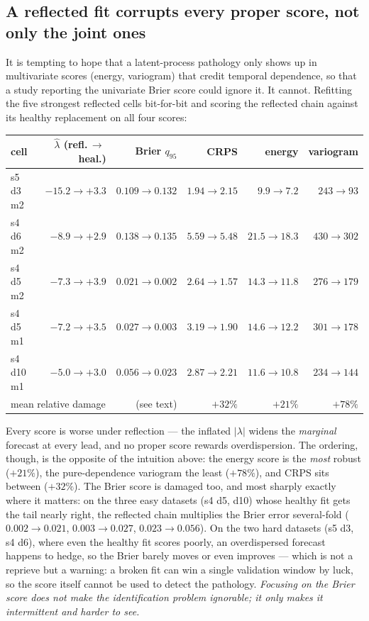 \documentclass[11pt]{article}
\begin{document}
\subsection{A reflected fit corrupts every proper score, not only the joint
ones}

It is tempting to hope that a latent-process pathology only shows up in
multivariate scores (energy, variogram) that credit temporal dependence, so
that a study reporting the univariate Brier score could ignore it. It cannot.
Refitting the five strongest reflected cells bit-for-bit and scoring the
reflected chain against its healthy replacement on all four scores:

\begin{center}
\small
\begin{tabular}{lrrrrr}
\toprule
cell & $\hat\lambda$ (refl.\,$\to$\,heal.) & Brier $q_{95}$ & CRPS & energy & variogram \\
\midrule
s5 d3 m2 & $-15.2 \to +3.3$ & $0.109 \to 0.132$ & $1.94 \to 2.15$ & $9.9 \to 7.2$ & $243 \to 93$ \\
s4 d6 m2 & $-8.9 \to +2.9$  & $0.138 \to 0.135$ & $5.59 \to 5.48$ & $21.5 \to 18.3$ & $430 \to 302$ \\
s4 d5 m2 & $-7.3 \to +3.9$  & $\mathbf{0.021 \to 0.002}$ & $2.64 \to 1.57$ & $14.3 \to 11.8$ & $276 \to 179$ \\
s4 d5 m1 & $-7.2 \to +3.5$  & $\mathbf{0.027 \to 0.003}$ & $3.19 \to 1.90$ & $14.6 \to 12.2$ & $301 \to 178$ \\
s4 d10 m1 & $-5.0 \to +3.0$ & $0.056 \to 0.023$ & $2.87 \to 2.21$ & $11.6 \to 10.8$ & $234 \to 144$ \\
\midrule
\multicolumn{2}{l}{mean relative damage} & (see text) & $+32\%$ & $+21\%$ & $+78\%$ \\
\bottomrule
\end{tabular}
\end{center}

Every score is worse under reflection --- the inflated $|\lambda|$ widens the
\emph{marginal} forecast at every lead, and no proper score rewards
overdispersion. The ordering, though, is the opposite of the intuition above:
the energy score is the \emph{most} robust ($+21\%$), the pure-dependence
variogram the least ($+78\%$), and CRPS sits between ($+32\%$). The Brier
score is damaged too, and most sharply exactly where it matters: on the three
easy datasets (s4 d5, d10) whose healthy fit gets the tail nearly right, the
reflected chain multiplies the Brier error several-fold ($0.002 \to 0.021$,
$0.003 \to 0.027$, $0.023 \to 0.056$). On the two hard datasets (s5 d3, s4 d6),
where even the healthy fit scores poorly, an overdispersed forecast happens to
hedge, so the Brier barely moves or even improves --- which is not a reprieve
but a warning: a broken fit can win a single validation window by luck, so the
score itself cannot be used to detect the pathology. \emph{Focusing on the
Brier score does not make the identification problem ignorable; it only makes
it intermittent and harder to see.}
\end{document}
